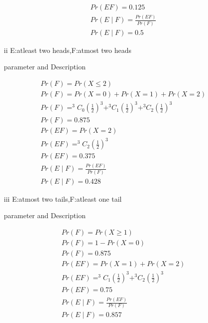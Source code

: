 \documentclass{article}
\begin{document}
\begin{enumerate}[label=13.\arabic{enumi}.\arabic{enumii}]
\begin{align}
Pr(EF)=0.125\\
Pr(E \mid F)=\frac{Pr(EF)}{Pr(F)}\\
Pr(E \mid F)=0.5
\end{align}
\item[ii] E:atleast two heads,F:atmost two heads\\
\begin{table}[h]
\centering
	
\caption{parameter and Description}
\label{tab:2} 
\end{table}
\begin{align}
Pr(F)=Pr(X\leq2)\\
Pr(F)=Pr(X=0)+Pr(X=1)+Pr(X=2)\\
Pr(F)=^{3}C_0 (\frac{1}{2})^{3}+ ^{3}C_1 (\frac{1}{2})^{3}+ ^{3}C_2 (\frac{1}{2})^{3}\\
Pr(F)=0.875\\
Pr(EF)=Pr(X=2)\\
Pr(EF)= ^{3}C_2 (\frac{1}{2})^{3}\\
Pr(EF)=0.375\\
Pr(E \mid F)=\frac{Pr(EF)}{Pr(F)}\\
Pr(E \mid F)=0.428
\end{align}
\item[iii]E:atmost two tails,F:atleast one tail\\
\begin{table}[h]
\centering
	
\caption{parameter and Description}
\label{tab:2} 
\end{table}
\begin{align}
Pr(F)=Pr(X\geq1)\\
Pr(F)=1-Pr(X=0)\\
Pr(F)=0.875\\
Pr(EF)=Pr(X=1)+Pr(X=2)\\
Pr(EF)=^{3}C_1 (\frac{1}{2})^{3}+^{3}C_2 (\frac{1}{2})^{3}\\
Pr(EF)=0.75\\
Pr(E \mid F)=\frac{Pr(EF)}{Pr(F)}\\
Pr(E \mid F)=0.857
\end{align}
\end{enumerate}
\end{document}

